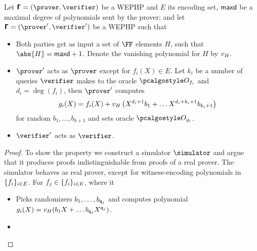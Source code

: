 \documentclass[runningheads,11pt]{llncs}
\begin{document}
\begin{theorem}
  Let $\PHP = (\prover, \verifier)$ be a WEPHP and $E$ its encoding set,
  $\mathsf{maxd}$ be a maximal degree of polynomials sent by the prover; and
  let $\PHP = (\prover', \verifier')$ be a WEPHP such that
  \begin{itemize}
  \item Both parties get as input a set of $\FF$ elements $H$, such that
    $\abs{H} = \maxdeg + 1$. Denote the vanishing polynomial for $H$ by $v_{H}$.
  \item $\prover'$ acts as $\prover$ except for $f_i(X) \in E$. Let $k_i$ be a
    number of queries $\verifier$ makes to the oracle $\oracleo_{f_i}$ and
    $d_i = \deg(f_i)$, then $\prover'$ computes
      \[
        g_i(X) = f_i(X) + v_{H}\left(X^{d_i + 1} b_1 + \ldots
        X^{d_i + k_i + 1} b_{k_i + 1}\right)
      \]
      for random $b_1, \ldots, b_{k + 1}$ and sets oracle $\oracleo_{g_i}$.
    \item $\verifier'$ acts as $\verifier$. 
  \end{itemize}
\end{theorem}
\begin{proof}


   To show the property we construct a simulator
  $\simulator$ and argue that it produces proofs indistinguishable from proofs
  of a real prover. The simulator behaves as real prover, except for
  witness-encoding polynomials in $\{f_i\}_{i \in E}$. For
  $f_j \in \{f_i\}_{i \in E}$, where it
  \begin{itemize}
  \item Picks randomizers $b_1, \ldots, b_{\mathsf{q}_j}$ and computes polynomial
    $g_i(X) =  v_{H}(b_1 X + \ldots b_{\mathsf{q}_j} X^{\mathsf{q}_j})$. 
  \item {}
  \end{itemize}
  
\end{proof}
\end{document}
